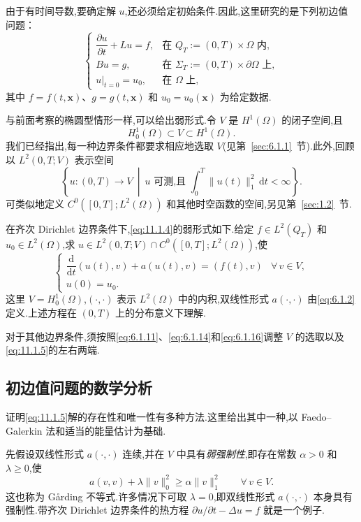 由于有时间导数,要确定解 \(u\),还必须给定初始条件.因此,这里研究的是下列初边值问题：
\begin{equation}\label{eq:11.1.4}
  \begin{cases}
    \dfrac{\partial u}{\partial t}+Lu=f,
       &\text{在 }Q_T:=(0,T)\times\Omega\text{ 内},\\
    Bu=g,&\text{在 }\Sigma_T:=(0,T)\times\partial\Omega\text{ 上},\\
    u|_{t=0}=u_0,&\text{在 }\Omega\text{ 上},
  \end{cases}
\end{equation}
其中 \(f=f(t,\boldsymbol{x})\)、\(g=g(t,\boldsymbol{x})\) 和 \(u_0=u_0(\boldsymbol{x})\) 为给定数据.

与前面考察的椭圆型情形一样,可以给出弱形式.令 \(V\) 是 \(H^1(\Omega)\) 的闭子空间,且
\[
  H_0^1(\Omega)\subset V\subset H^1(\Omega).
\]
我们已经指出,每一种边界条件都要求相应地选取 \(V\)(见第~\ref{sec:6.1.1}~节).此外,回顾以 \(L^2(0,T;V)\) 表示空间
\[
  \left\{u:(0,T)\to V\ \middle|\
    u\text{ 可测,且 }\int_0^T\|u(t)\|_1^2\,\mathrm dt<\infty\right\}.
\]
可类似地定义 \(C^0([0,T];L^2(\Omega))\) 和其他时空函数的空间,另见第~\ref{sec:1.2}~节.

在齐次 Dirichlet 边界条件下,\eqref{eq:11.1.4}的弱形式如下.给定 \(f\in L^2(Q_T)\) 和 \(u_0\in L^2(\Omega)\),求 \(u\in L^2(0,T;V)\cap C^0([0,T];L^2(\Omega))\),使
\begin{equation}\label{eq:11.1.5}
  \begin{cases}
    \dfrac{\mathrm d}{\mathrm dt}(u(t),v)+a(u(t),v)=(f(t),v)
         &\forall\,v\in V,\\
    u(0)=u_0.&
  \end{cases}
\end{equation}
这里 \(V=H_0^1(\Omega)\),\((\cdot,\cdot)\) 表示 \(L^2(\Omega)\) 中的内积,双线性形式 \(a(\cdot,\cdot)\) 由\eqref{eq:6.1.2}定义.上述方程在 \((0,T)\) 上的分布意义下理解.

对于其他边界条件,须按照\eqref{eq:6.1.11}、\eqref{eq:6.1.14}和\eqref{eq:6.1.16}调整 \(V\) 的选取以及\eqref{eq:11.1.5}的左右两端.

\subsection{初边值问题的数学分析}\label{sec:11.1.1}

证明\eqref{eq:11.1.5}解的存在性和唯一性有多种方法.这里给出其中一种,以 Faedo--Galerkin 法和适当的能量估计为基础.

先假设双线性形式 \(a(\cdot,\cdot)\) 连续,并在 \(V\) 中具有\emph{弱强制性},即存在常数 \(\alpha>0\) 和 \(\lambda\ge0\),使
\begin{equation}\label{eq:11.1.6}
  a(v,v)+\lambda\|v\|_0^2\ge\alpha\|v\|_1^2\qquad\forall\,v\in V.
\end{equation}
这也称为 Gårding 不等式.许多情况下可取 \(\lambda=0\),即双线性形式 \(a(\cdot,\cdot)\) 本身具有强制性.带齐次 Dirichlet 边界条件的热方程 \(\partial u/\partial t-\Delta u=f\) 就是一个例子.

